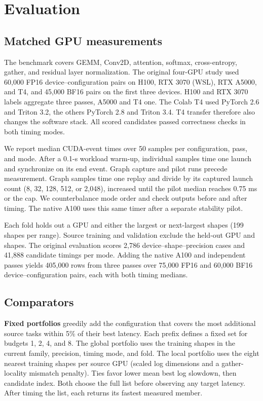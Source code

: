 \documentclass[conference]{IEEEtran}
\begin{document}
\section{Evaluation}
\subsection{Matched GPU measurements}
The benchmark covers GEMM, Conv2D, attention, softmax, cross-entropy,
gather, and residual layer normalization. The original four-GPU study
used 60,000 FP16 device--configuration pairs on H100, RTX 3070 (WSL),
RTX A5000, and T4, and 45,000 BF16 pairs on the first three devices.
H100 and RTX 3070 labels aggregate three passes, A5000 and T4 one.
The Colab T4 used PyTorch 2.6 and Triton 3.2, the others PyTorch 2.8
and Triton 3.4. T4 transfer therefore also changes the software stack.
All scored candidates passed correctness checks in both timing modes.

We report median CUDA-event times over 50 samples per configuration,
pass, and mode. After a 0.1-s workload warm-up, individual samples time
one launch and synchronize on its end event. Graph capture and pilot
runs precede measurement. Graph samples time one replay and divide by its captured
launch count (8, 32, 128, 512, or 2,048), increased until the pilot
median reaches 0.75 ms or the cap. We counterbalance mode order and
check outputs before and after timing. The native A100 uses this same
timer after a separate stability pilot.

Each fold holds out a GPU and either the largest or next-largest shapes
(199 shapes per range). Source training and validation exclude the
held-out GPU and shapes. The original evaluation scores 2,786
device--shape--precision cases and 41,888 candidate timings per mode.
Adding the native A100 and independent passes yields 405,000 rows from
three passes over 75,000 FP16 and 60,000 BF16 device--configuration
pairs, each with both timing medians.

\subsection{Comparators}
\textbf{Fixed portfolios} greedily add the configuration that covers the
most additional source tasks within 5\% of their best latency. Each
prefix defines a fixed set for budgets 1, 2, 4, and 8. The global
portfolio uses the training shapes in the current family, precision,
timing mode, and fold. The local portfolio uses
the eight nearest training shapes per source GPU (scaled log dimensions
and a gather-locality mismatch penalty). Ties favor lower mean best log
slowdown, then candidate index. Both choose the full list before observing
any target latency. After timing the list, each returns its fastest
measured member.
\end{document}
